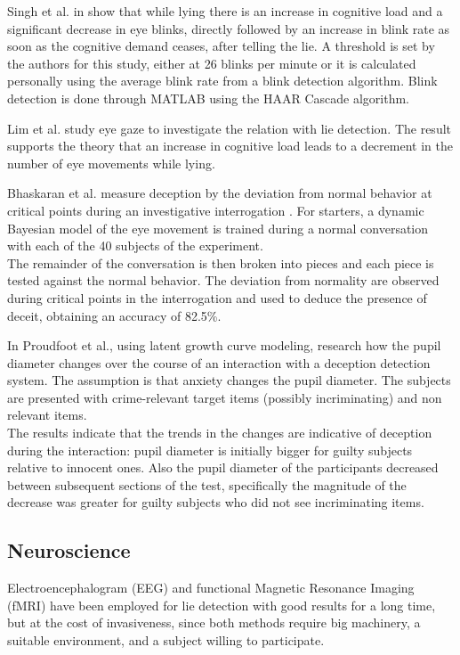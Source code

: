 Singh et al. in \cite{7324092} show that while lying there is an increase in cognitive load and a significant decrease in eye blinks, directly followed by an increase in blink rate as soon as the cognitive demand ceases, after telling the lie. A threshold is set by the authors for this study, either at 26 blinks per minute or it is calculated personally using the average blink rate from a blink detection algorithm. Blink detection is done through MATLAB using the HAAR Cascade algorithm.

Lim et al. study eye gaze \cite{Lim:2013:LTE:2535948.2535954} to investigate the relation with lie detection. The result supports the theory that an increase in cognitive load leads to a decrement in the number of eye movements while lying.

Bhaskaran et al. measure deception by the deviation from normal behavior at critical points during an investigative interrogation \cite{5771407} . For starters, a dynamic Bayesian model of the eye movement is trained during a normal conversation with each of the 40 subjects of the experiment. \\
The remainder of the conversation is then broken into pieces and each piece is tested against the normal behavior. The deviation from normality are observed during critical points in the interrogation and used to deduce the presence of deceit, obtaining an accuracy of 82.5\%.

In \cite{7165946} Proudfoot et al., using latent growth curve modeling, research how the pupil diameter changes over the course of an interaction with a deception detection system. The assumption is that anxiety changes the pupil diameter. The subjects are presented with crime-relevant target items (possibly incriminating) and non relevant items. \\
The results indicate that the trends in the changes are indicative of deception during the interaction: pupil diameter is initially bigger for guilty subjects relative to innocent ones. Also the pupil diameter of the participants decreased between subsequent sections of the test, specifically the magnitude of the decrease was greater for guilty subjects who did not see incriminating items.

\subsection*{Neuroscience}
Electroencephalogram (EEG) and functional Magnetic Resonance Imaging (fMRI) have been employed for lie detection with good results for a long time, but at the cost of invasiveness, since both methods require big machinery, a suitable environment, and a subject willing to participate.

